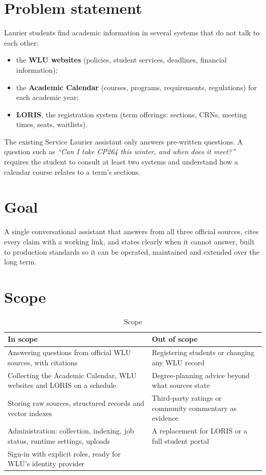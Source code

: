 \documentclass[11pt,letterpaper]{report}
\begin{document}
\section{Problem statement}
Laurier students find academic information in several systems that do not talk to each other:
\begin{itemize}
  \item the \textbf{WLU websites} (policies, student services, deadlines, financial information);
  \item the \textbf{Academic Calendar} (courses, programs, requirements, regulations) for each academic year;
  \item \textbf{LORIS}, the registration system (term offerings: sections, CRNs, meeting times, seats, waitlists).
\end{itemize}
The existing Service Laurier assistant only answers pre-written questions. A question such as
\emph{``Can I take CP264 this winter, and when does it meet?''} requires the student to consult at
least two systems and understand how a calendar course relates to a term's sections.

\section{Goal}
A single conversational assistant that answers from all three official sources, cites every claim
with a working link, and states clearly when it cannot answer, built to production standards so it
can be operated, maintained and extended over the long term.

\section{Scope}
\begin{table}[H]
\centering
\caption{Scope}
\begin{tabularx}{\textwidth}{@{}LL@{}}
\toprule
\textbf{In scope} & \textbf{Out of scope} \\
\midrule
Answering questions from official WLU sources, with citations & Registering students or changing any WLU record \\
Collecting the Academic Calendar, WLU websites and LORIS on a schedule & Degree-planning advice beyond what sources state \\
Storing raw sources, structured records and vector indexes & Third-party ratings or community commentary as evidence \\
Administration: collection, indexing, job status, runtime settings, uploads & A replacement for LORIS or a full student portal \\
Sign-in with explicit roles, ready for WLU's identity provider & \\
\bottomrule
\end{tabularx}
\end{table}
\end{document}
